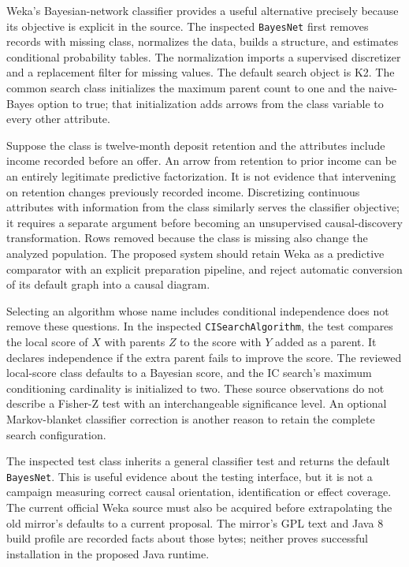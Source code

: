 Weka's Bayesian-network classifier provides a useful alternative
precisely because its objective is explicit in the source. The inspected
\texttt{BayesNet} first removes records with missing class, normalizes
the data, builds a structure, and estimates conditional probability
tables. The normalization imports a supervised discretizer and a
replacement filter for missing values. The default search object is K2.
The common search class initializes the maximum parent count to one and
the naive-Bayes option to true; that initialization adds arrows from the
class variable to every other attribute. \citep{exec13_java_weka}

Suppose the class is twelve-month deposit retention and the attributes
include income recorded before an offer. An arrow from retention to
prior income can be an entirely legitimate predictive factorization. It
is not evidence that intervening on retention changes previously
recorded income. Discretizing continuous attributes with information
from the class similarly serves the classifier objective; it requires a
separate argument before becoming an unsupervised causal-discovery
transformation. Rows removed because the class is missing also change
the analyzed population. The proposed system should retain Weka as a
predictive comparator with an explicit preparation pipeline, and reject
automatic conversion of its default graph into a causal diagram.
\citep{exec13_java_weka}

Selecting an algorithm whose name includes conditional independence does
not remove these questions. In the inspected \texttt{CISearchAlgorithm},
the test compares the local score of \(X\) with parents \(Z\) to the
score with \(Y\) added as a parent. It declares independence if the
extra parent fails to improve the score. The reviewed local-score class
defaults to a Bayesian score, and the IC search's maximum conditioning
cardinality is initialized to two. These source observations do not
describe a Fisher-Z test with an interchangeable significance level. An
optional Markov-blanket classifier correction is another reason to
retain the complete search configuration. \citep{exec13_java_weka}

The inspected test class inherits a general classifier test and returns
the default \texttt{BayesNet}. This is useful evidence about the testing
interface, but it is not a campaign measuring correct causal
orientation, identification or effect coverage. The current official
Weka source must also be acquired before extrapolating the old mirror's
defaults to a current proposal. The mirror's GPL text and Java 8 build
profile are recorded facts about those bytes; neither proves successful
installation in the proposed Java runtime. \citep{exec13_java_weka}

